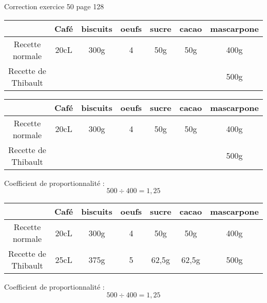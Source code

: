 \documentclass[a4paper,10pt]{beamer}
\begin{document}
\renewcommand{\arraystretch}{1.2}

\begin{frame}
	\begin{center}
		\LARGE

		Correction exercice 50 page 128
	\end{center}
\end{frame}

\begin{frame}
	\begin{tabular}{|c|c|c|c|c|c|c|}
		\hline
		                    & Café & biscuits & oeufs & sucre & cacao & mascarpone \\ \hline
		Recette normale     & 20cL & 300g     & 4     & 50g   & 50g   & 400g       \\ \hline
		Recette de Thibault &      &          &       &       &       & 500g       \\ \hline
	\end{tabular}
\end{frame}

\begin{frame}
	\begin{tabular}{|c|c|c|c|c|c|c|}
		\hline
		                    & Café & biscuits & oeufs & sucre & cacao & mascarpone \\ \hline
		Recette normale     & 20cL & 300g     & 4     & 50g   & 50g   & 400g       \\ \hline
		Recette de Thibault &      &          &       &       &       & 500g       \\ \hline
	\end{tabular} \vspace{3em}

	{\large\center Coefficient de proportionnalité :
		$$ 500 ÷ 400 = 1,25 $$}
\end{frame}

\begin{frame}
	\begin{tabular}{|c|c|c|c|c|c|c|}
		\hline
		                    & Café & biscuits & oeufs & sucre & cacao & mascarpone \\ \hline
		Recette normale     & 20cL & 300g     & 4     & 50g   & 50g   & 400g       \\ \hline
		Recette de Thibault & 25cL & 375g     & 5     & 62,5g & 62,5g & 500g       \\ \hline
	\end{tabular} \vspace{3em}

	{\large\center Coefficient de proportionnalité :
		$$ 500 ÷ 400 = 1,25 $$}
\end{frame}
\end{document}
